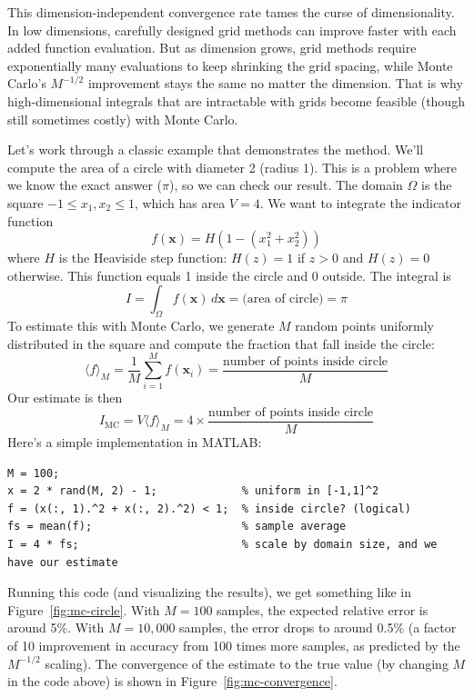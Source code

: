 This dimension-independent convergence rate tames the curse of dimensionality. In low dimensions, carefully designed grid methods can improve faster with each added function evaluation. But as dimension grows, grid methods require exponentially many evaluations to keep shrinking the grid spacing, while Monte Carlo's $M^{-1/2}$ improvement stays the same no matter the dimension. That is why high-dimensional integrals that are intractable with grids become feasible (though still sometimes costly) with Monte Carlo.

Let's work through a classic example that demonstrates the method. We'll compute the area of a circle with diameter 2 (radius 1). This is a problem where we know the exact answer ($\pi$), so we can check our result. The domain $\Omega$ is the square $-1 \leq x_1, x_2 \leq 1$, which has area $V = 4$. We want to integrate the indicator function
\begin{equation}
    f(\mathbf{x}) = H(1 - (x_1^2 + x_2^2))
\end{equation}
where $H$ is the Heaviside step function: $H(z) = 1$ if $z > 0$ and $H(z) = 0$ otherwise. This function equals 1 inside the circle and 0 outside. The integral is
\begin{equation}
    I = \int_{\Omega} f(\mathbf{x}) \, d\mathbf{x} = \text{(area of circle)} = \pi
\end{equation} 
To estimate this with Monte Carlo, we generate $M$ random points uniformly distributed in the square and compute the fraction that fall inside the circle:
\begin{equation}
    \langle f \rangle_M = \frac{1}{M} \sum_{i=1}^{M} f(\mathbf{x}_i) = \frac{\text{number of points inside circle}}{M}
\end{equation}
Our estimate is then
\begin{equation}
    I_{\text{MC}} = V \langle f \rangle_M = 4 \times \frac{\text{number of points inside circle}}{M}
\end{equation}
Here's a simple implementation in MATLAB:
\begin{verbatim}
M = 100;
x = 2 * rand(M, 2) - 1;             % uniform in [-1,1]^2
f = (x(:, 1).^2 + x(:, 2).^2) < 1;  % inside circle? (logical)
fs = mean(f);                       % sample average
I = 4 * fs;                         % scale by domain size, and we have our estimate
\end{verbatim}
Running this code (and visualizing the results), we get something like in Figure~\ref{fig:mc-circle}. With $M=100$ samples, the expected relative error is around 5\%. With $M=10{,}000$ samples, the error drops to around 0.5\% (a factor of 10 improvement in accuracy from 100 times more samples, as predicted by the $M^{-1/2}$ scaling). The convergence of the estimate to the true value (by changing $M$ in the code above) is shown in Figure~\ref{fig:mc-convergence}.
